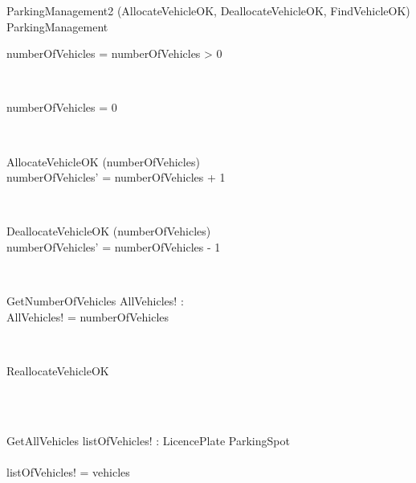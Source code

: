 \documentclass[12pt]{article}
\begin{document}
\begin{spacing}{1.5}
\begin{class}{ParkingManagement2}
\upharpoonright (AllocateVehicleOK, DeallocateVehicleOK, FindVehicleOK)\\
ParkingManagement\\
\begin{state}
numberOfVehicles = 
\where
numberOfVehicles > 0
\end{state} \\
\begin{init}
numberOfVehicles = 0 \\
\end{init} \\
\begin{op}{AllocateVehicleOK}
\Delta (numberOfVehicles)\\
\ST
numberOfVehicles' = numberOfVehicles + 1\\
\end{op}\\
\begin{op}{DeallocateVehicleOK}
\Delta (numberOfVehicles)\\
\ST
numberOfVehicles' = numberOfVehicles - 1\\
\end{op}\\
\begin{op}{GetNumberOfVehicles }
AllVehicles! : \\
\ST
AllVehicles! = numberOfVehicles\\
\end{op}\\
\begin{op}{ReallocateVehicleOK}
\\
\ST
\\
\end{op}\\
\begin{op}{GetAllVehicles}
listOfVehicles! : LicencePlate  \rightarrowtail ParkingSpot\\\\
\ST
listOfVehicles! = vehicles\\
\end{op}\\
\end{class}





\end{spacing}
\end{document}
